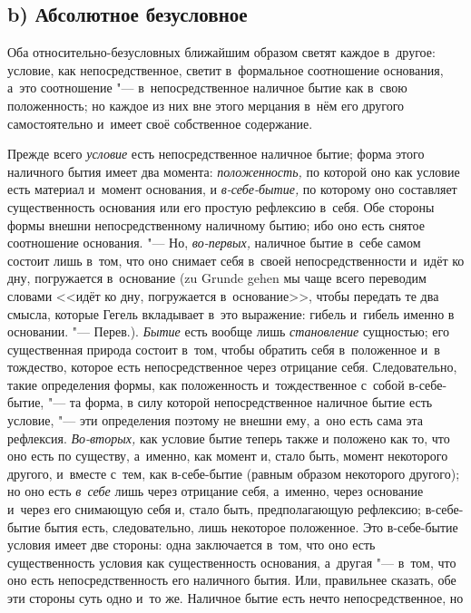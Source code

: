 \subsection[b) Абсолютное безусловное]{b) Абсолютное безусловное}

Оба относительно-безусловных ближайшим образом
светят каждое в~другое: условие, как непосредственное, светит в~формальное
соотношение основания, а~это соотношение "--- в~непосредственное наличное
бытие как в~свою положенность; но каждое из них вне этого мерцания в~нём
его другого самостоятельно и~имеет своё собственное содержание.

Прежде всего {\em условие} есть непосредственное
наличное бытие; форма этого наличного бытия имеет два момента:
{\em положенность,} по которой оно как условие есть
материал и~момент основания, и {\em в-себе-бытие,} по
которому оно составляет существенность основания или его простую рефлексию
в~себя. Обе стороны формы внешни непосредственному наличному бытию; ибо оно
есть снятое соотношение основания. "--- Но,
{\em во-первых,} наличное бытие в~себе самом состоит
лишь в~том, что оно снимает себя в~своей непосредственности и~идёт ко дну,
погружается в~основание (zu Grunde gehen мы чаще всего переводим словами
<<идёт ко дну, погружается в~основание>>, чтобы передать те два смысла,
которые Гегель вкладывает в~это выражение: гибель и~гибель именно в
основании. "--- Перев.). {\em Бытие} есть вообще лишь
{\em становление} сущностью; его существенная природа
состоит в~том, чтобы обратить себя в~положенное и~в тождество, которое есть
непосредственное через отрицание себя. Следовательно, такие определения
формы, как положенность и~тождественное с~собой в-себе-бытие, "--- та форма, в
силу которой непосредственное наличное бытие есть условие, "--- эти
определения поэтому не внешни ему, а~оно есть сама эта рефлексия.
{\em Во-вторых,} как условие бытие теперь также и
положено как то, что оно есть по существу, а~именно, как момент и, стало
быть, момент некоторого другого, и~вместе с~тем, как в-себе-бытие (равным
образом некоторого другого); но оно есть {\em в~себе}
лишь через отрицание себя, а~именно, через основание и~через его снимающую
себя и, стало быть, предполагающую рефлексию; в-себе-бытие бытия есть,
следовательно, лишь некоторое положенное. Это в-себе-бытие условия имеет
две стороны: одна заключается в~том, что оно есть существенность условия
как существенность основания, а~другая "--- в~том, что оно есть
непосредственность его наличного бытия. Или, правильнее сказать, обе эти
стороны суть одно и~то же. Наличное бытие есть нечто непосредственное, но
